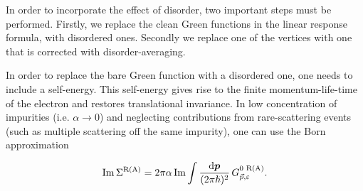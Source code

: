 In order to incorporate the effect of disorder, two important steps must be performed. Firstly, we replace the clean Green functions in the linear response formula, with disordered ones. Secondly we replace one of the vertices with one that is corrected with disorder-averaging.

In order to replace the bare Green function with a disordered one, one needs to include a self-energy. This self-energy gives rise to the finite momentum-life-time of the electron and restores translational invariance.  In low concentration of impurities (i.e. $\alpha\rightarrow0$) and neglecting contributions from rare-scattering events (such as multiple scattering off the same impurity), one can use the Born approximation

\begin{equation}
    \operatorname{Im} \Sigma^\text{R(A)} = 2\pi\alpha \operatorname{Im} \int \frac{\mathrm{d}\boldsymbol{p}}{(2\pi\hslash)^2}\,G^\text{0 R(A)}_{\vec{p},\varepsilon}.
    \label{sd:eq:sigma}
\end{equation}

